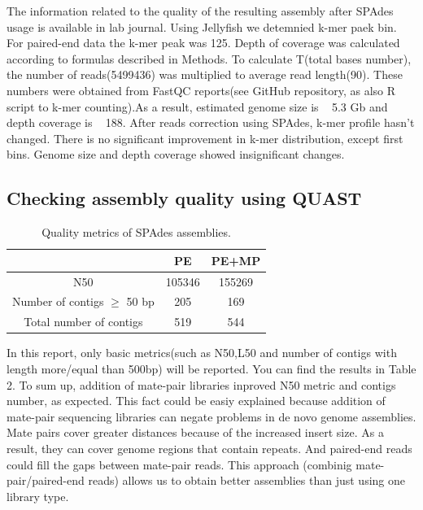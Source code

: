 \documentclass{article}
\begin{document}
The information related to the quality of the resulting assembly after SPAdes usage is available in lab journal.
Using Jellyfish we detemnied k-mer paek bin. For paired-end data the k-mer peak was 125. Depth of coverage was calculated according to formulas described in Methods. To calculate T(total bases number), the number of reads(5499436) was multiplied to average read length(90). These numbers were obtained from FastQC reports(see GitHub repository, as also R script to k-mer counting).As a result, estimated genome size is ~ 5.3 Gb and depth coverage is ~ 188.
After reads correction using SPAdes, k-mer profile hasn't changed. There is no significant improvement in k-mer distribution, except first bins. Genome size and depth coverage showed insignificant changes.
\subsection{ Checking assembly quality using QUAST}
	\begin{table} 
	\centering
	\begin{tabular}{|c|c|c|}
		\hline
		 & PE & PE+MP   \\
		\hline
		N50   & 105346  & 155269 \\
		\hline
		Number of contigs $\geq$ 50 bp & 205 & 169\\
		\hline
		Total number of contigs & 519 &  544 \\
		\hline
	\end{tabular}
	\caption{  Quality metrics of SPAdes assemblies. }
	\label{tab:2}
\end{table}
In this report, only basic metrics(such as N50,L50 and number of contigs with length more/equal than 500bp) will be reported. You can find the results in Table 2.
To sum up, addition of mate-pair libraries inproved N50 metric and contigs number, as expected. This fact could be easiy explained because addition of mate-pair sequencing libraries can negate problems in de novo genome assemblies. Mate pairs cover greater distances because of the increased insert size. As a result, they can cover genome regions that contain repeats. And  paired-end reads could fill the gaps between mate-pair reads. This approach (combinig mate-pair/paired-end reads) allows us to obtain better assemblies than just using one library type.
\end{document}
